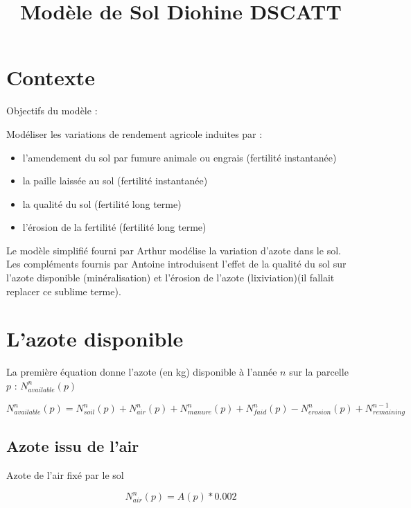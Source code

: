 \documentclass[10pt,a4paper,french]{article} %
\title{Modèle de Sol Diohine DSCATT}
\begin{document}
\maketitle


\section{Contexte}

Objectifs du modèle :


Modéliser les variations de rendement agricole induites par : 

\begin{itemize}
	\item l'amendement du sol par fumure animale ou engrais (fertilité instantanée)
	\item la paille laissée au sol (fertilité instantanée)
	\item la qualité du sol (fertilité long terme)
	\item l'érosion de la fertilité (fertilité long terme)
\end{itemize} 

\vspace{0.5cm}
Le modèle simplifié fourni par Arthur modélise la variation d'azote dans le sol. 
Les compléments fournis par Antoine introduisent l'effet de la qualité du sol sur l'azote disponible (minéralisation) et l'érosion de l'azote (lixiviation)(il fallait replacer ce sublime terme). 



\section{L'azote disponible}



La première équation donne l'azote (en kg) disponible à l'année $n$ sur la parcelle $p$ : $N_{available}^{n}(p)$

\begin{equation}
N_{available}^{n}(p)=N_{soil}^{n}(p)+N_{air}^{n}(p)+N_{manure}^{n}(p)+N_{faid}^{n}(p)-N_{erosion}^n(p) + N_{remaining}^{n-1}
\end{equation}


\subsection{Azote issu de l'air}


Azote de l'air fixé par le sol

\begin{equation}
N_{air}^{n}(p) = A(p) * 0.002
\end{equation}
\end{document}
